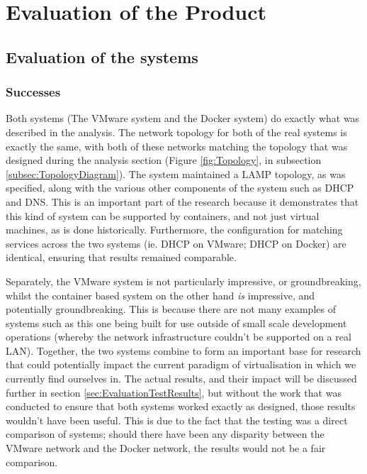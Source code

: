 

\chapter{Evaluation of the Product}
\section{Evaluation of the systems}
\subsection{Successes}
Both systems (The VMware system and the Docker system) do exactly what was described in the analysis. The network topology for both of the real systems is exactly the same, with both of these networks matching the topology that was designed during the analysis section (Figure \ref{fig:Topology}, in subsection \ref{subsec:TopologyDiagram}). The system maintained a LAMP topology, as was specified, along with the various other components of the system such as DHCP and DNS. This is an important part of the research because it demonstrates that this kind of system can be supported by containers, and not just virtual machines, as is done historically. Furthermore, the configuration for matching services across the two systems (ie. DHCP on VMware; DHCP on Docker) are identical, ensuring that results remained comparable.

Separately, the VMware system is not particularly impressive, or groundbreaking, whilst the container based system on the other hand \emph{is} impressive, and potentially groundbreaking. This is because there are not many examples of systems such as this one being built for use outside of small scale development operations (whereby the network infrastructure couldn't be supported on a real LAN). Together, the two systems combine to form an important base for research that could potentially impact the current paradigm of virtualisation in which we currently find ourselves in. The actual results, and their impact will be discussed further in section \ref{sec:EvaluationTestResults}, but without the work that was conducted to ensure that both systems worked exactly as designed, those results wouldn't have been useful. This is due to the fact that the testing was a direct comparison of systems; should there have been any disparity between the VMware network and the Docker network, the results would not be a fair comparison.

